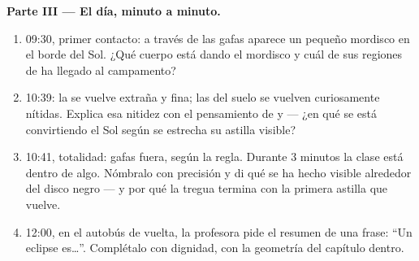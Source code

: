 \begin{problem}
\medskip\noindent\textbf{Parte III --- El día, minuto a minuto.}
\begin{enumerate}[resume]
  \item 09:30, primer contacto: a través de las gafas aparece un
        pequeño mordisco en el borde del Sol. ¿Qué cuerpo está dando
        el mordisco y cuál de sus regiones de  ha llegado al
        campamento?
  \item 10:39: la  se vuelve extraña y fina; las 
        del suelo se vuelven curiosamente nítidas. Explica esa nitidez
        con el pensamiento de  y  --- ¿en qué se está
        convirtiendo el Sol según se estrecha su astilla visible?
  \item 10:41, totalidad: gafas fuera, según la regla. Durante $3$
        minutos la clase está dentro de algo. Nómbralo con precisión y
        di qué se ha hecho visible alrededor del disco negro --- y por
        qué la tregua termina con la primera astilla que vuelve.
  \item 12:00, en el autobús de vuelta, la profesora pide el resumen
        de una frase: ``Un eclipse es\dots''. Complétalo con dignidad,
        con la geometría del capítulo dentro.
\end{enumerate}
\end{problem}
